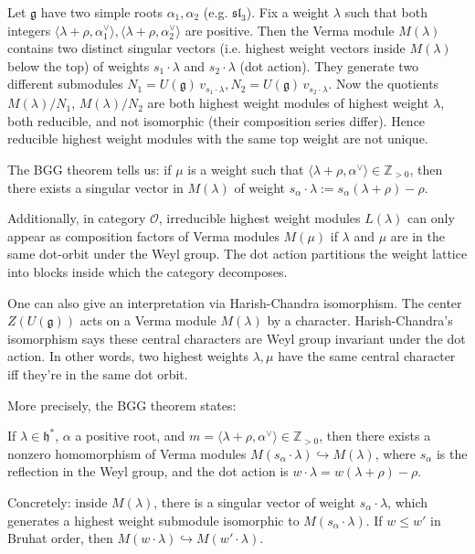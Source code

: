 \documentclass[12pt]{article}
\begin{document}
\begin{remark} Let $\mathfrak{g}$ have two simple roots $\alpha_1, \alpha_2$ (e.g. $\mathfrak{sl}_3$). Fix a weight $\lambda$ such that both integers
    $\langle \lambda+\rho, \alpha_1^\vee \rangle, \langle \lambda+\rho, \alpha_2^\vee \rangle$
    are positive. Then the Verma module $M(\lambda)$ contains two distinct singular vectors (i.e. highest weight vectors inside $M(\lambda)$ below the top) of weights $s_1\!\cdot\!\lambda$ and $s_2\!\cdot\!\lambda$ (dot action).
    They generate two different submodules $N_1 = U(\mathfrak{g})\,v_{s_1\cdot\lambda}, N_2 = U(\mathfrak{g})\,v_{s_2\cdot\lambda}$. Now the quotients $M(\lambda)/N_1$, $M(\lambda)/N_2$ are both highest weight modules of highest weight $\lambda$, both reducible, and not isomorphic (their composition series differ). Hence reducible highest weight modules with the same top weight are not unique.
\end{remark}

\begin{remark}
     The BGG theorem tells us: if $\mu$ is a weight such that $\langle \lambda+\rho,\alpha^\vee\rangle \in \mathbb{Z}_{>0}$, then there exists a singular vector in $M(\lambda)$ of weight $s_\alpha\cdot\lambda := s_\alpha(\lambda+\rho)-\rho$.

    Additionally, in category $\mathcal{O}$, irreducible highest weight modules $L(\lambda)$ can only appear as composition factors of Verma modules $M(\mu)$ if $\lambda$ and $\mu$ are in the same dot-orbit under the Weyl group. The dot action partitions the weight lattice into blocks inside which the category decomposes.

    One can also give an interpretation via Harish-Chandra isomorphism. The center $Z(U(\mathfrak{g}))$ acts on a Verma module $M(\lambda)$ by a character. Harish-Chandra's isomorphism says these central characters are Weyl group invariant under the dot action. In other words, two highest weights $\lambda,\mu$ have the same central character iff they're in the same dot orbit.
\end{remark}

More precisely, the BGG theorem states:
\begin{theorem}
    If $\lambda \in \mathfrak{h}^*$, $\alpha$ a positive root, and
    $m = \langle \lambda+\rho, \alpha^\vee\rangle \in \mathbb{Z}_{>0}$,
    then there exists a nonzero homomorphism of Verma modules
    $M(s_\alpha \cdot \lambda) \hookrightarrow M(\lambda)$,
    where $s_\alpha$ is the reflection in the Weyl group, and the dot action is
    $w \cdot \lambda = w(\lambda+\rho) - \rho$.


    Concretely: inside $M(\lambda)$, there is a singular vector of weight $s_\alpha \cdot \lambda$, which generates a highest weight submodule isomorphic to $M(s_\alpha \cdot \lambda)$. If $w \leq w'$ in Bruhat order, then $M(w \cdot \lambda) \hookrightarrow M(w' \cdot \lambda)$.
\end{theorem}
\end{document}
